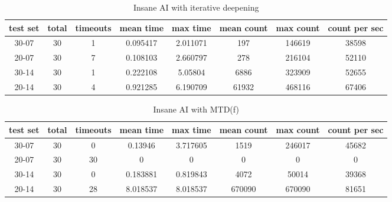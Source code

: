 \documentclass[a4paper]{article}
\begin{document}
\begin{table}[h]
	\centering
	\begin{adjustbox}{center}
	\begin{tabular}{|c|c|c|c|c|c|c|c|}\hline
	\textbf{test set} & \textbf{total} & \textbf{timeouts} & \textbf{mean time} & \textbf{max time} & \textbf{mean count} & \textbf{max count} & \textbf{count per sec} \\\hline
	30-07 & 30 & 1 & 0.095417 & 2.011071 & 197 & 146619 & 38598 \\\hline
	20-07 & 30 & 7 & 0.108103 & 2.660797 & 278 & 216104 & 52110 \\\hline
	30-14 & 30 & 1 & 0.222108 & 5.05804 & 6886 & 323909 & 52655 \\\hline
	20-14 & 30 & 4 & 0.921285 & 6.190709 & 61932 & 468116 & 67406 \\\hline
	\end{tabular}
	\end{adjustbox}
	\caption{Insane AI with iterative deepening}
	\label{tab: bench insane iter}
\end{table}

\begin{table}[h]
	\centering
	\begin{adjustbox}{center}
	\begin{tabular}{|c|c|c|c|c|c|c|c|}\hline
	\textbf{test set} & \textbf{total} & \textbf{timeouts} & \textbf{mean time} & \textbf{max time} & \textbf{mean count} & \textbf{max count} & \textbf{count per sec} \\\hline
	30-07 & 30 & 0 & 0.13946 & 3.717605 & 1519 & 246017 & 45682 \\\hline
	20-07 & 30 & 30 & 0 & 0 & 0 & 0 & 0 \\\hline
	30-14 & 30 & 0 & 0.183881 & 0.819843 & 4072 & 50014 & 39368 \\\hline
	20-14 & 30 & 28 & 8.018537 & 8.018537 & 670090 & 670090 & 81651 \\\hline
	\end{tabular}
	\end{adjustbox}
	\caption{Insane AI with MTD(f)}
	\label{tab: bench insane mtdf}
\end{table}
\end{document}
